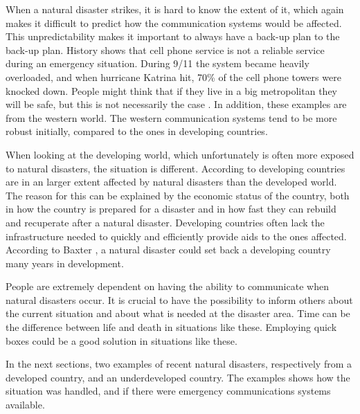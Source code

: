 When a natural disaster strikes, it is hard to know the extent of it, which  again makes it difficult to predict how the communication systems would be affected. This unpredictability makes it important to always have a back-up plan to the back-up plan. History shows that cell phone service is not a reliable service during an emergency situation. During 9/11 the system became heavily overloaded, and when hurricane Katrina hit, 70\% of the cell phone towers were knocked down. People might think that if they live in a big metropolitan they will be safe, but this is not necessarily the case \cite{disasterComm}. In addition, these examples are from the western world. The western communication systems tend to be more robust initially, compared to the ones in developing countries. 

When looking at the developing world, which unfortunately is often more exposed to natural disasters, the situation is different. According to \cite{DevelopingWorld, 360} developing countries are in an larger extent affected by natural disasters than the developed world. The reason for this can be explained by the economic status of the country, both in how the country is prepared for a disaster and in how fast they can rebuild and recuperate after a natural disaster. Developing countries often lack the infrastructure needed to quickly and efficiently provide aids to the ones affected. According to Baxter \cite{360}, a natural disaster could set back a developing country many years in development.  

People are extremely dependent on having the ability to communicate when natural disasters occur. It is crucial to have the possibility to inform others about the current situation and about what is needed at the disaster area. Time can be the difference between life and death in situations like these. Employing \gls{quick} boxes could be a good solution in situations like these. 

In the next sections, two examples of recent natural disasters, respectively from a developed country, and an underdeveloped country. The examples shows how the situation was handled, and if there were emergency communications systems available. 

